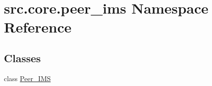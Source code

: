 \hypertarget{namespacesrc_1_1core_1_1peer__ims}{}\section{src.\+core.\+peer\+\_\+ims Namespace Reference}
\label{namespacesrc_1_1core_1_1peer__ims}
\subsection*{Classes}
\begin{DoxyCompactItemize}
\item 
class \hyperlink{classsrc_1_1core_1_1peer__ims_1_1Peer__IMS}{Peer\+\_\+\+I\+M\+S}
\end{DoxyCompactItemize}
